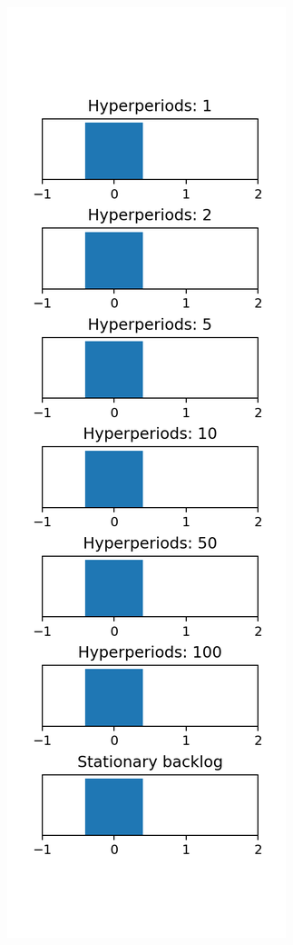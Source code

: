 \documentclass[a4paper,oneside]{csthesis}
\begin{document}
\begin{figure}[p]
    \begin{subfigure}[c]{0.3\textwidth}
        \includegraphics[width=\textwidth]{figures/ex_backlogs0.png}

\end{subfigure}
\end{figure}
\end{document}
